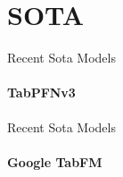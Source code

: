 \section{SOTA}

\begin{frame}{Recent Sota Models}
  \framesubtitle{TabPFNv3}
\end{frame}

\begin{frame}{Recent Sota Models}
  \framesubtitle{Google TabFM}
\end{frame}
